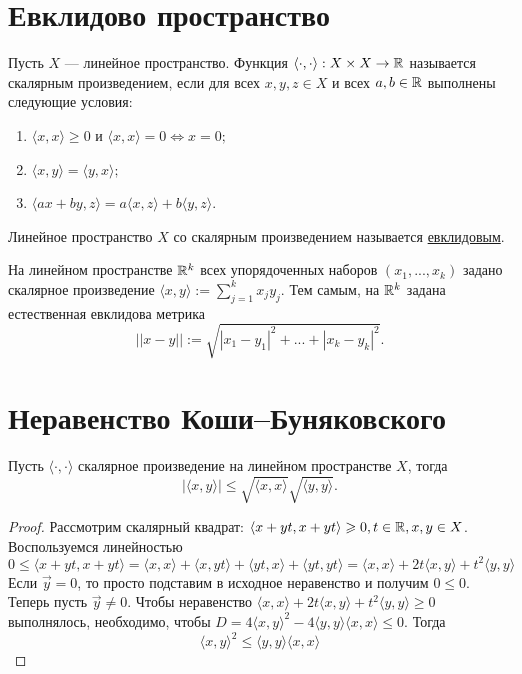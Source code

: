     \section{Евклидово пространство}
    
    \begin{definition}
    	Пусть $X$ — линейное пространство. Функция $\langle\cdot, \cdot\rangle: X \times X \rightarrow \mathbb R$ называется скалярным произведением, если для всех $x, y, z \in X$ и всех $a, b \in \mathbb R$ выполнены следующие условия:
    	\begin{enumerate}
    		\item $\langle x, x \rangle \geqslant 0$ и $\langle x, x \rangle = 0 \Leftrightarrow x = 0;$
    		\item $\langle x, y \rangle = \langle y, x \rangle;$
    		\item $\langle ax + by, z \rangle = a\langle x, z \rangle + b\langle y, z \rangle.$
    	\end{enumerate}
    	Линейное пространство $X$ со скалярным произведением называется \underline{евклидовым}.
    \end{definition}
    
    \begin{example}
    	На линейном пространстве $\mathbb R^k$ всех упорядоченных наборов $(x_1, ..., x_k)$ задано скалярное произведение $\langle x, y \rangle := \sum_{j = 1}^k x_j y_j.$ Тем самым, на $\mathbb R^k$ задана естественная евклидова метрика
    	\[ ||x - y|| := \sqrt{|x_1 - y_1|^2 + ... + |x_k - y_k|^2}. \]
    \end{example}
    
    \section{Неравенство Коши–Буняковского}
    
    \begin{lemma}
    	Пусть $\langle \cdot, \cdot \rangle$ скалярное произведение на линейном пространстве $X$, тогда
    	\[ |\langle x, y \rangle| \leqslant \sqrt{\langle x, x \rangle} \sqrt{\langle y, y \rangle}. \]
    \end{lemma}
    
    \begin{proof}
    	Рассмотрим скалярный квадрат: $\langle x + yt, x + yt \rangle \geqslant 0, t \in \mathbb R, x, y \in X$. Воспользуемся линейностью
    	\[ 0 \leqslant \langle x + yt, x + yt \rangle = \langle x, x \rangle + \langle x, yt \rangle + \langle yt, x \rangle + \langle yt, yt \rangle = \langle x, x \rangle + 2t\langle x, y \rangle + t^2\langle y, y \rangle \]
        Если $\vec{y} = 0$, то просто подставим в исходное неравенство и получим $0 \leqslant 0$. Теперь пусть $\vec{y} \neq 0$. Чтобы неравенство $\langle x, x \rangle + 2t\langle x, y \rangle + t^2\langle y, y \rangle \geqslant 0$ выполнялось, необходимо, чтобы $D = 4\langle x, y \rangle^2 - 4 \langle y, y \rangle \langle x, x \rangle \leqslant 0$. Тогда
        \[ \langle x, y \rangle^2 \leqslant \langle y, y \rangle \langle x, x \rangle \]
    \end{proof}
    
